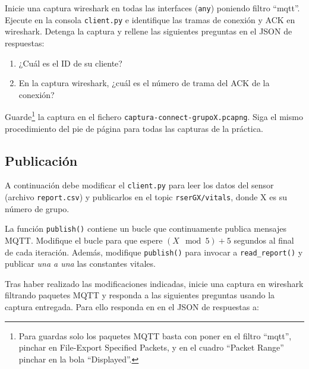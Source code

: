 \documentclass{upmassignment}
\begin{document}
\begin{problemlist}
    \pbitem Inicie una captura wireshark
        en todas las interfaces
        (\texttt{any}) poniendo filtro
        ``mqtt''. Ejecute en la consola
        \texttt{client.py} e identifique
        las tramas de conexión y ACK
        en wireshark. Detenga la captura
        y rellene las
        siguientes preguntas en el
        JSON de respuestas:
        \begin{enumerate}
            \item ¿Cuál es el ID de su cliente?
            \item En la captura wireshark,
                ¿cuál es el número de trama
                del ACK de la conexión?
        \end{enumerate}
        Guarde\footnote{Para guardas solo los paquetes MQTT
                basta con poner en el filtro
                ``mqtt'',
                pinchar en
                File-Export Specified Packets,
                y en el cuadro ``Packet
                Range'' pinchar en la
                bola  ``Displayed''.}
                la captura en el fichero
        \texttt{captura-connect-grupoX.pcapng}.
Siga el mismo procedimiento del
pie de página para todas las capturas
de la práctica.
\end{problemlist}



\subsection*{Publicación}
\noindent A continuación debe
modificar el \texttt{client.py} para
leer los datos del sensor
(archivo \texttt{report.csv}) y publicarlos
en el topic
\texttt{rserGX/vitals}, donde X
es su número de grupo.

La función \texttt{publish()}
contiene un bucle que continuamente publica
mensajes MQTT. Modifique el bucle
para que espere
$(X\mod{5}) + 5$ segundos al final de cada
iteración.
Además, modifique \texttt{publish()}
para invocar a \texttt{read\_report()} y
publicar \emph{una a una}
las constantes vitales.



Tras haber realizado las modificaciones
indicadas, inicie una captura en
wireshark filtrando paquetes MQTT y
responda a las siguientes
preguntas usando la captura entregada.
Para ello responda en
en el JSON de respuestas a:
\end{document}
